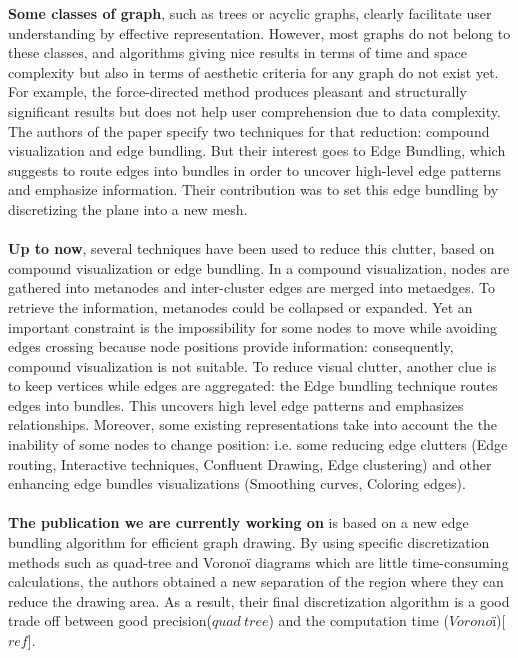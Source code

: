 \textbf{Some classes of graph}, such as trees or acyclic graphs, clearly facilitate user understanding by effective representation. However, most graphs do not belong to these classes, and algorithms giving nice results in terms of time and space complexity but also in terms of aesthetic criteria for any graph do not exist yet. For example, the force-directed method produces pleasant and structurally significant results but does not help user comprehension due to data complexity. The authors of the paper specify two techniques for that reduction: compound visualization and edge bundling. But their interest goes to Edge Bundling, which suggests to route edges into bundles in order to uncover high-level edge patterns and emphasize information. Their contribution was to set this edge bundling by discretizing the plane into a new mesh.
\\
\\
\textbf{Up to now}, several techniques have been used to reduce this clutter, based on compound visualization or edge bundling. In a compound visualization, nodes are gathered into metanodes and inter-cluster edges are merged into metaedges. To retrieve the information, metanodes could be collapsed or expanded. Yet an important constraint is the impossibility for some nodes to move while avoiding edges crossing because node positions provide information: consequently, compound visualization is not suitable. To reduce visual clutter, another clue is to keep vertices while edges are aggregated: the Edge bundling technique routes edges into bundles. This uncovers high level edge patterns and emphasizes relationships. Moreover, some existing representations take into account the the inability of some nodes to change position: i.e.  some reducing edge clutters (Edge routing, Interactive techniques, Confluent Drawing, Edge clustering) and other enhancing edge bundles visualizations (Smoothing curves, Coloring edges). 
\\
\\
\textbf{The publication we are currently working on} is based on a new edge bundling algorithm for efficient graph drawing. By using specific  discretization methods such as quad-tree and Voronoï diagrams which are little time-consuming calculations, the authors obtained a new separation of the region where they can reduce the drawing area. As a result, their final discretization algorithm is a good trade off between good precision($quad~tree$) and the computation time ($Voronoï$)[$ref$].

